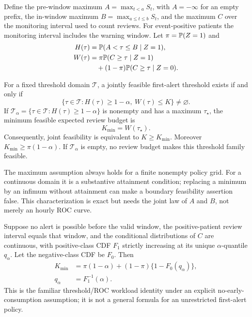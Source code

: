 Define the pre-window maximum $A=\max_{t<a}S_t$, with $A=-\infty$ for an empty prefix, the in-window maximum $B=\max_{a\le t\le b}S_t$, and the maximum $C$ over the monitoring interval used to count reviews. For event-positive patients the monitoring interval includes the warning window. Let $\pi=\mathbb P(Z=1)$ and
\begin{equation*}
 \begin{aligned}
 H(\tau)&=\mathbb P(A<\tau\le B\mid Z=1),\\
 W(\tau)&=\pi\mathbb P(C\ge\tau\mid Z=1)\\
 &\quad +(1-\pi)\mathbb P(C\ge\tau\mid Z=0).
 \end{aligned}
\end{equation*}

\begin{theorem}
For a fixed threshold domain $\mathcal T$, a jointly feasible first-alert threshold exists if and only if
\[
 \{\tau\in\mathcal T:H(\tau)\ge 1-\alpha,\ W(\tau)\le K\}\ne\varnothing.
\]
If $\mathcal T_\alpha=\{\tau\in\mathcal T:H(\tau)\ge1-\alpha\}$ is nonempty and has a maximum $\tau_\star$, the minimum feasible expected review budget is
\begin{equation*}
 K_{\min}=W(\tau_\star).
\end{equation*}
Consequently, joint feasibility is equivalent to $K\ge K_{\min}$. Moreover $K_{\min}\ge\pi(1-\alpha)$. If $\mathcal T_\alpha$ is empty, no review budget makes this threshold family feasible.
\end{theorem}
The maximum assumption always holds for a finite nonempty policy grid. For a continuous domain it is a substantive attainment condition; replacing a minimum by an infimum without attainment can make a boundary feasibility assertion false. This characterization is exact but needs the joint law of $A$ and $B$, not merely an hourly ROC curve.

\begin{corollary}
Suppose no alert is possible before the valid window, the positive-patient review interval equals that window, and the conditional distributions of $C$ are continuous, with positive-class CDF $F_1$ strictly increasing at its unique $\alpha$-quantile $q_\alpha$. Let the negative-class CDF be $F_0$. Then
\begin{equation*}
 \begin{aligned}
 K_{\min}&=\pi(1-\alpha)+(1-\pi)\{1-F_0(q_\alpha)\},\\
 q_\alpha&=F_1^{-1}(\alpha).
 \end{aligned}
\end{equation*}
This is the familiar threshold/ROC workload identity under an explicit no-early-consumption assumption; it is not a general formula for an unrestricted first-alert policy.
\end{corollary}

